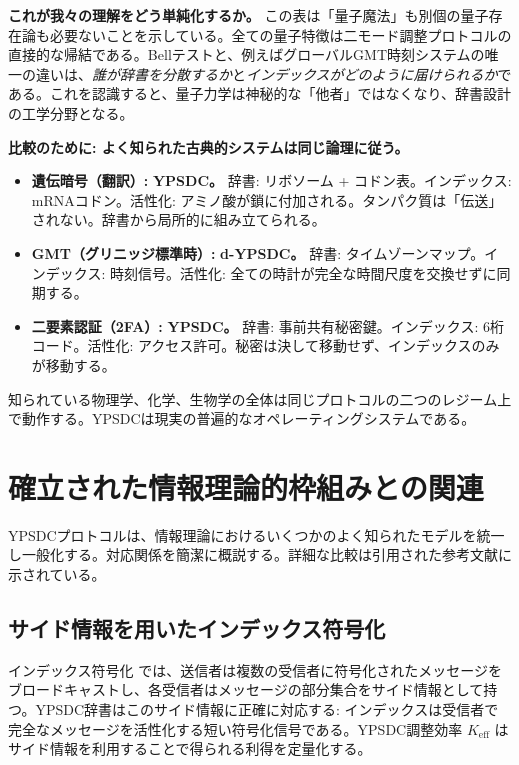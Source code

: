 \documentclass[12pt,a4paper]{article}
\theoremstyle{definition}
\theoremstyle{remark}
\begin{document}
	\noindent
	\textbf{これが我々の理解をどう単純化するか。}
	この表は「量子魔法」も別個の量子存在論も必要ないことを示している。全ての量子特徴は二モード調整プロトコルの直接的な帰結である。Bellテストと、例えばグローバルGMT時刻システムの唯一の違いは、\emph{誰が辞書を分散するか}と\emph{インデックスがどのように届けられるか}である。これを認識すると、量子力学は神秘的な「他者」ではなくなり、辞書設計の工学分野となる。
	
	\textbf{比較のために: よく知られた古典的システムは同じ論理に従う。}
	\begin{itemize}
		\item \textbf{遺伝暗号（翻訳）:} \textbf{YPSDC。} 辞書: リボソーム + コドン表。インデックス: mRNAコドン。活性化: アミノ酸が鎖に付加される。タンパク質は「伝送」されない。辞書から局所的に組み立てられる。
		\item \textbf{GMT（グリニッジ標準時）:} \textbf{d-YPSDC。} 辞書: タイムゾーンマップ。インデックス: 時刻信号。活性化: 全ての時計が完全な時間尺度を交換せずに同期する。
		\item \textbf{二要素認証（2FA）:} \textbf{YPSDC。} 辞書: 事前共有秘密鍵。インデックス: 6桁コード。活性化: アクセス許可。秘密は決して移動せず、インデックスのみが移動する。
	\end{itemize}
	
	知られている物理学、化学、生物学の全体は同じプロトコルの二つのレジーム上で動作する。YPSDCは現実の普遍的なオペレーティングシステムである。
	
	\section{確立された情報理論的枠組みとの関連}
	\label{sec:classical-connections}
	
	YPSDCプロトコルは、情報理論におけるいくつかのよく知られたモデルを統一し一般化する。対応関係を簡潔に概説する。詳細な比較は引用された参考文献に示されている。
	
	\subsection*{サイド情報を用いたインデックス符号化}
	インデックス符号化 \cite{Birk1998,BarYossef2011} では、送信者は複数の受信者に符号化されたメッセージをブロードキャストし、各受信者はメッセージの部分集合をサイド情報として持つ。YPSDC辞書はこのサイド情報に正確に対応する: インデックスは受信者で完全なメッセージを活性化する短い符号化信号である。YPSDC調整効率 $K_{\mathrm{eff}}$ はサイド情報を利用することで得られる利得を定量化する。
	
\end{document}

